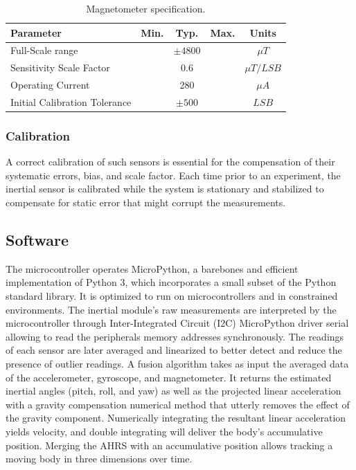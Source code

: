 \begin{table}[H]
    \begin{center}
        \begin{tabular}[t]{lcccc}
            \hline
            Parameter                     & Min. & Typ.       & Max. & Units        \\
            \hline
            Full-Scale range              &      & $\pm 4800$ &      & $\mu T$      \\
            Sensitivity Scale Factor      &      & 0.6        &      & $\mu T/ LSB$ \\
            Operating Current             &      & 280        &      & $\mu A$      \\
            Initial Calibration Tolerance &      & $\pm 500$  &      & $LSB$        \\
            \hline
        \end{tabular}
        \caption{Magnetometer specification. }
        \label{tab:magnetometer_multiplication}
    \end{center}
\end{table}

\subsubsection{Calibration}

A correct calibration of such sensors is essential for the compensation of their systematic errors, bias, and scale factor. Each time prior to an experiment, the inertial sensor is calibrated while the system is stationary and stabilized to compensate for static error that might corrupt the measurements.


\subsection{Software}
The microcontroller operates MicroPython, a barebones and efficient implementation of Python 3, which incorporates a small subset of the Python standard library. It is optimized to run on microcontrollers and in constrained environments. The inertial module's raw measurements are interpreted by the microcontroller through Inter-Integrated Circuit (I2C) MicroPython driver serial allowing to read the peripherals memory addresses synchronously. The readings of each sensor are later averaged and linearized to better detect and reduce the presence of outlier readings. A fusion algorithm takes as input the averaged data of the accelerometer, gyroscope, and magnetometer. It returns the estimated inertial angles (pitch, roll, and yaw) as well as the projected linear acceleration with a gravity compensation numerical method that utterly removes the effect of the gravity component. Numerically integrating the resultant linear acceleration yields velocity, and double integrating will deliver the body's accumulative position. Merging the AHRS with an accumulative position allows tracking a moving body in three dimensions over time.

